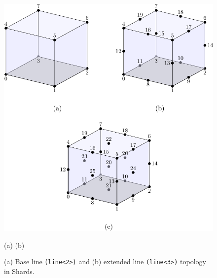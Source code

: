 \documentclass[11pt]{article}
\begin{document}
 \begin{figure}[htpb]
   \begin{center}
       \includegraphics[width=5.0in]{hex_node.pdf}%
     \end{center}
    \begin{center}  (a) \hspace{5cm} (b) \end{center}
   \caption{(a) Base line {\tt (line<2>)} and (b) extended line {\tt (line<3>)} topology in Shards.}
  \label{fig:line}
  \end{figure}
\end{document}
